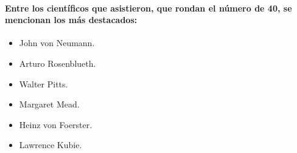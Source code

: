   \paragraph{Entre los científicos que asistieron, que rondan el número de 40, se mencionan los más destacados:}
  \begin{itemize}
    \item John von Neumann.
    \item Arturo Rosenblueth.
    \item Walter Pitts.
    \item Margaret Mead.
    \item Heinz von Foerster.
    \item Lawrence Kubie.
  \end{itemize}
  \clearpage
